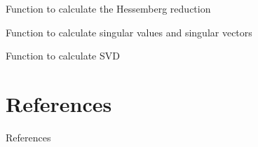 \documentclass[10pt]{beamer}
\begin{document}
\begin{frame}{Function to calculate the Hessemberg reduction}
    
\end{frame}

\begin{frame}{Function to calculate singular values and singular vectors}
    
\end{frame}

\begin{frame}[fragile]{Function to calculate SVD}
    
\end{frame}

\section{References}
\begin{frame}{References}
    \printbibliography
\end{frame}
\end{document}
